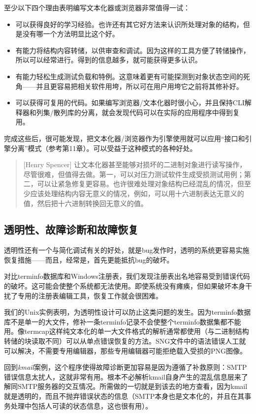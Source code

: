 \documentclass[12pt,oneside]{ctexbook}
\begin{document}
\begin{common-format}
至少以下四个理由表明编写文本化器或浏览器非常值得一试：
\begin{itemize}
\item 可以获得良好的学习经验。也许还有其它好方法来认识所处理对象的结构，但是没有哪一个方法明显比这个好。
\item 有能力将结构内容转储，以供审查和调试。因为这样的工具方便了转储操作，所以可以经常进行。得到的信息越多，就可能获得更多认识。
\item  有能力轻松生成测试负载和特例。这意味着更有可能探测到对象状态空间的死角——并且更容易把相关软件用垮，所以可在用户用垮它之前将其修补好。
\item 可以获得可复用的代码。如果编写浏览器/文本化器时很小心，并且保持CLI解释器和列集/散列库的分离，就会发现代码可以在实际的应用程序中得到复用。
\end{itemize}

完成这些后，很可能发现，把文本化器/浏览器作为引擎使用就可以应用“接口和引擎分离”模式（参考第11章）。可以受益于这种模式的各种好处。

\begin{quote}[Henry Spencer]
让文本化器甚至能够对损坏的二进制对象进行读写操作，尽管很难，但值得去做。第一，可以对压力测试软件生成受损测试用例；第二，可以让紧急修复更容易。也许很难处理对象结构已经混乱的情况，但至少应该处理结构内容无意义的情况，例如，可以用十六进制表达无意义的值，然后把十六进制转换回无意义的值。
\end{quote}


\subsection{透明性、故障诊断和故障恢复}
透明性还有一个与简化调试有关的好处，就是bug发作时，透明的系统更容易实施恢复措施——而且，经常是，首先更能抵抗bug的破坏。

对比terminfo数据库和Windows注册表，我们发现注册表出名地容易受到错误代码的破坏。这可能会使整个系统都无法使用。即使系统没有瘫痪，但如果破坏本身干扰了专用的注册表编辑工具，恢复工作就会很困难。

我们的Unix实例表明，为透明性设计可以防止这类问题的发生。因为terminfo数据库不是单一的大文件，修补一条terminfo记录不会使整个terminfo数据集都不能用。像termcap这样纯文本化的单一大文件格式的解析通常都使用（与二进制结构转储的块读取不同）可以从单点错误恢复的方法。SNG文件中的语法错误人工就可以解决，不需要专用编辑器，那些专用编辑器可能拒绝载入受损的PNG图像。

回到\textit{kmail}案例，这个程序使得故障诊断更加容易是因为遵循了补救原则：SMTP错误信息太扰人，这就非常有用。根本不必解析kmail自身产生的混乱信息层来了解同SMTP服务器的交互情况。所需做的一切就是到该去的地方查看，因为kmail就是透明的，而且不抛弃错误状态的信息（SMTP本身也是文本化的，并且在其事务处理中包括人可读的状态信息，这也很有用）。


\end{common-format}
\end{document}
